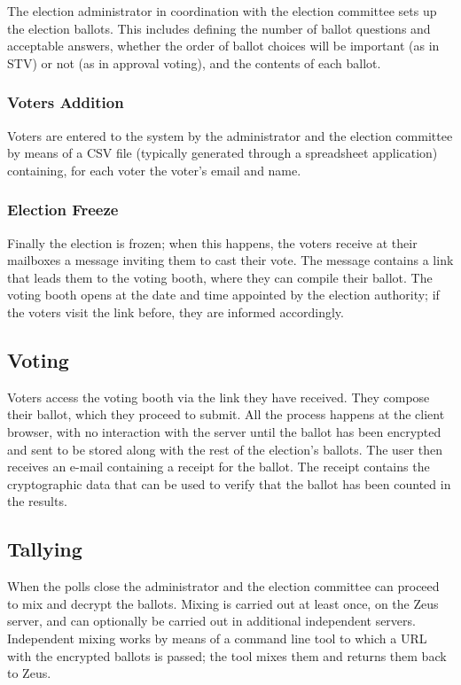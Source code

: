\documentclass[letterpaper,twocolumn,10pt]{article}
\begin{document}
The election administrator in coordination with the election committee
sets up the election ballots. This includes defining the number of
ballot questions and acceptable answers, whether the order of ballot
choices will be important (as in STV) or not (as in approval voting),
and the contents of each ballot.

\subsubsection{Voters Addition}

Voters are entered to the system by the administrator and the election
committee by means of a CSV file (typically generated through a
spreadsheet application) containing, for each voter the voter's email
and name.

\subsubsection{Election Freeze}

Finally the election is frozen; when this happens, the voters receive
at their mailboxes a message inviting them to cast their vote. The
message contains a link that leads them to the voting booth, where
they can compile their ballot. The voting booth opens at the date and
time appointed by the election authority; if the voters visit the link
before, they are informed accordingly.

\subsection{Voting}

Voters access the voting booth via the link they have received. They
compose their ballot, which they proceed to submit. All the process
happens at the client browser, with no interaction with the server
until the ballot has been encrypted and sent to be stored along with
the rest of the election's ballots. The user then receives an e-mail
containing a receipt for the ballot. The receipt contains the
cryptographic data that can be used to verify that the ballot has been
counted in the results.

\subsection{Tallying}

When the polls close the administrator and the election committee can
proceed to mix and decrypt the ballots. Mixing is carried out at least
once, on the Zeus server, and can optionally be carried out in
additional independent servers. Independent mixing works by means of a
command line tool to which a URL with the encrypted ballots is passed;
the tool mixes them and returns them back to Zeus. 
\end{document}
